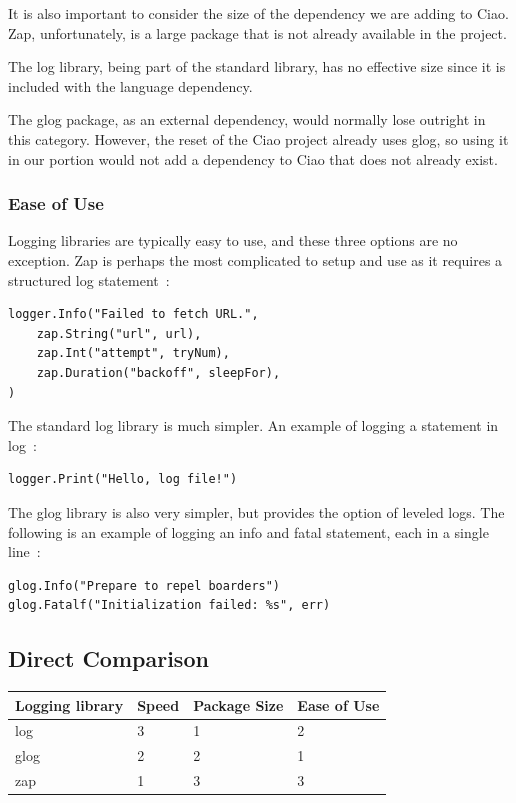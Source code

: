 \documentclass[10pt,letterpaper,onecolumn,draftclsnofoot]{IEEEtran}
\begin{document}
It is also important to consider the size of the dependency we are adding to
Ciao. Zap, unfortunately, is a large package that is not already available in
the project.

The log library, being part of the standard library, has no effective size since
it is included with the language dependency.

The glog package, as an external dependency, would normally lose outright in
this category. However, the reset of the Ciao project already uses glog, so
using it in our portion would not add a dependency to Ciao that does not already
exist.

\subsubsection{Ease of Use}

Logging libraries are typically easy to use, and these three options are no
exception. Zap is perhaps the most complicated to setup and use as it requires a
structured log statement~\cite{zap}:

\begin{lstlisting}
logger.Info("Failed to fetch URL.",
	zap.String("url", url),
	zap.Int("attempt", tryNum),
	zap.Duration("backoff", sleepFor),
)
\end{lstlisting}

The standard log library is much simpler. An example of logging a statement in
log~\cite{log}:

\begin{lstlisting}
logger.Print("Hello, log file!")
\end{lstlisting}

The glog library is also very simpler, but provides the option of leveled logs.
The following is an example of logging an info and fatal statement, each in a
single line~\cite{glog}:

\begin{lstlisting}
glog.Info("Prepare to repel boarders")
glog.Fatalf("Initialization failed: %s", err)
\end{lstlisting}

\subsection{Direct Comparison}

\begin{center}
	\begin{tabular}{| l | l | l | l |}
		\hline
		Logging library & Speed & Package Size & Ease of Use
		\\ \hline
		log  & 3 & 1 & 2 \\ \hline
		glog & 2 & 2 & 1 \\ \hline
		zap  & 1 & 3 & 3 \\ \hline
	\end{tabular}
\end{center}
\end{document}
